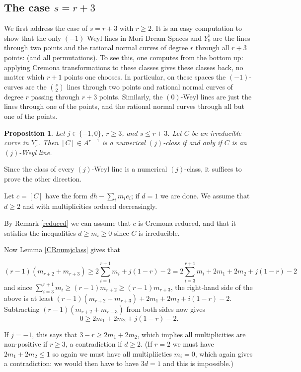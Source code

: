 \documentclass[12pt]{article}
\newtheorem{proposition}[equation]{Proposition}
\numberwithin{equation}{section}
\numberwithin{subeq}{equation}
\begin{document}
\subsection{The case $s = r+3$}\label{iclasses}
We first address the case of $s = r+3$ with $r\geq 2$.
It is an easy computation to show that the only $(-1)$ Weyl lines in Mori Dream Spaces and $Y^5_9$
are the lines through two points and the rational normal curves of degree $r$ through all $r+3$ points:
 (and all permutations). To see this, one computes from the bottom up:
applying Cremona transformations to these classes gives these classes back,
no matter which $r+1$ points one chooses.  In particular, on these spaces the $(-1)$-curves are the $\binom{s}{2}$ lines through two points and rational normal curves of degree $r$ passing through $r+3$ points. Similarly, the $(0)$-Weyl lines are just the lines through one of the points,
and the rational normal curves through all but one of the points.


\begin{proposition}\label{cremona}
Let $j\in \{-1, 0\}$, $r \geq 3$, and $s\leq r+3$. Let $C$ be an irreducible curve in $Y^r_s$.
Then $[C]\in A^{r-1}$ is a numerical $(j)$-class if and only if $C$ is an $(j)$-Weyl line.
\end{proposition}

\medskip{}
Since the class of every $(j)$-Weyl line is a numerical $(j)$-class,
it suffices to prove the other direction.

Let $c=[C]$ have the form $d h - \sum_i m_i e_i$;
if $d=1$ we are done.  We assume that $d \geq 2$
and with multiplicities ordered decreasingly.

By Remark \ref{reduced} we can assume that $c$ is Cremona reduced,
and that it satisfies the inequalities $d \geq m_i \geq 0$
since $C$ is irreducible.

Now Lemma \ref{CRnumjclass} gives that

\[
(r-1)(m_{r+2}+m_{r+3}) \geq 2 \sum_{i=1}^{r+1} m_i +j(1-r)-2 = 2 \sum_{i=3}^{r+1} m_i + 2m_{1}+2m_{2}+j(1-r)-2 
\]
and since $\sum_{i=3}^{r+1} m_i \geq (r-1)m_{r+2} \geq (r-1)m_{r+3}$,
the right-hand side of the above is at least
$(r-1)(m_{r+2}+m_{r+3}) + 2m_{1}+2m_{2}+i(1-r)-2$.
Subtracting  $(r-1)(m_{r+2}+m_{r+3})$ from both sides now gives
\[
0 \geq 2m_{1}+2m_{2}+j(1-r)-2.
\]

If $j=-1$, this says that $3-r \geq 2m_1+2m_2$,
which implies all multiplicities are non-positive if $r\geq 3$,
a contradiction if $d\geq 2$.
(If $r=2$ we must have $2m_1+2m_2 \leq 1$
so again we must have all multipliicties $m_i=0$,
which again gives a contradiction:
we would then have to have $3d = 1$ and this is impossible.)
\end{document}
